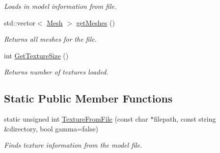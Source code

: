 \begin{DoxyCompactItemize}
\begin{DoxyCompactList}\small\item\em Loads in model information from file. \end{DoxyCompactList}\item 
\hypertarget{class_model_a12c9acf4e5cf6150de113251148b98f8}{std\+::vector$<$ \hyperlink{class_mesh}{Mesh} $>$ \hyperlink{class_model_a12c9acf4e5cf6150de113251148b98f8}{get\+Meshes} ()}\label{class_model_a12c9acf4e5cf6150de113251148b98f8}

\begin{DoxyCompactList}\small\item\em Returns all meshes for the file. \end{DoxyCompactList}\item 
\hypertarget{class_model_a6e6ff4851692b4eb499108c7c4df6da3}{int \hyperlink{class_model_a6e6ff4851692b4eb499108c7c4df6da3}{Get\+Texture\+Size} ()}\label{class_model_a6e6ff4851692b4eb499108c7c4df6da3}

\begin{DoxyCompactList}\small\item\em Returns number of textures loaded. \end{DoxyCompactList}\end{DoxyCompactItemize}
\subsection*{Static Public Member Functions}
\begin{DoxyCompactItemize}
\item 
\hypertarget{class_model_a16c263d87f6368d21d5ab255468c2c90}{static unsigned int \hyperlink{class_model_a16c263d87f6368d21d5ab255468c2c90}{Texture\+From\+File} (const char $\ast$filepath, const string \&directory, bool gamma=false)}\label{class_model_a16c263d87f6368d21d5ab255468c2c90}

\begin{DoxyCompactList}\small\item\em Finds texture information from the model file. \end{DoxyCompactList}\end{DoxyCompactItemize}
